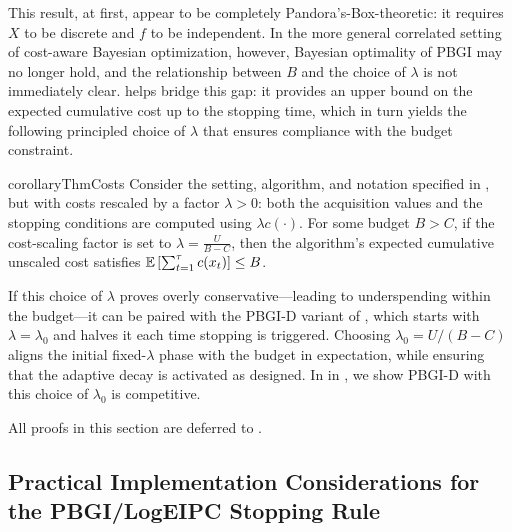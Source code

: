 This result, at first, appear to be completely Pandora's-Box-theoretic: it requires $X$ to be discrete and $f$ to be independent. 
In the more general correlated setting of cost-aware Bayesian optimization, however, Bayesian optimality of PBGI may no longer hold, and the relationship between $B$ and the choice of $\lambda$ is not immediately clear.  helps bridge this gap: it provides an upper bound on the expected cumulative cost up to the stopping time, which in turn yields the following principled choice of $\lambda$ that ensures compliance with the budget constraint.

\begin{restatable}{corollary}{ThmCosts}
\label{thm:lambda_for_budget}
Consider the setting, algorithm, and notation specified in , but with costs rescaled by a factor $\lambda > 0$: both the acquisition values and the stopping conditions are computed using $\lambda c(\cdot)$. 
For some budget $B>C$, if the cost-scaling factor is set to $\lambda = \frac{U}{B - C}$, 
then the algorithm’s expected cumulative unscaled cost satisfies $\mathbb{E}\left[\sum_{t=1}^{\tau} c(x_t)\right] \leq B$.
\end{restatable}
If this choice of $\lambda$ proves overly conservative—leading to underspending within the budget—it can be paired with the PBGI-D variant of \citet{xie2024cost}, which starts with $\lambda=\lambda_0$ and halves it each time stopping is triggered. Choosing $\lambda_0 = U/(B-C)$ aligns the initial fixed-$\lambda$ phase with the budget in expectation, while ensuring that the adaptive decay is activated as designed. In  in , we show PBGI-D with this choice of $\lambda_0$ is competitive.

All proofs in this section are deferred to .

\subsection{Practical Implementation Considerations for the PBGI/LogEIPC Stopping Rule}

\label{subsec:practical-consideration}
